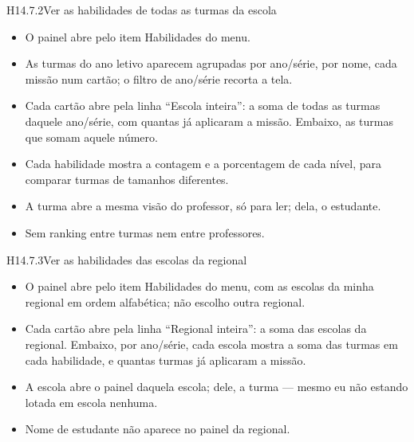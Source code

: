 \begin{historia}{H14.7.2}{Ver as habilidades de todas as turmas da escola}{\parcial}
\aceite
\begin{itemize}
  \item O painel abre pelo item Habilidades do menu.
  \item As turmas do ano letivo aparecem agrupadas por ano/série, por nome,
    cada missão num cartão; o filtro de ano/série recorta a tela.
  \item Cada cartão abre pela linha \enquote{Escola inteira}: a soma de todas
    as turmas daquele ano/série, com quantas já aplicaram a missão. Embaixo,
    as turmas que somam aquele número.
  \item Cada habilidade mostra a contagem e a porcentagem de cada nível, para
    comparar turmas de tamanhos diferentes.
  \item A turma abre a mesma visão do professor, só para ler; dela, o
    estudante.
  \item Sem ranking entre turmas nem entre professores.
\end{itemize}
\end{historia}

\begin{historia}{H14.7.3}{Ver as habilidades das escolas da regional}{\parcial}
\aceite
\begin{itemize}
  \item O painel abre pelo item Habilidades do menu, com as escolas da minha
    regional em ordem alfabética; não escolho outra regional.
  \item Cada cartão abre pela linha \enquote{Regional inteira}: a soma das
    escolas da regional. Embaixo, por ano/série, cada escola mostra a soma das
    turmas em cada habilidade, e quantas turmas já aplicaram a missão.
  \item A escola abre o painel daquela escola; dele, a turma --- mesmo eu não
    estando lotada em escola nenhuma.
  \item Nome de estudante não aparece no painel da regional.
\end{itemize}
\end{historia}

